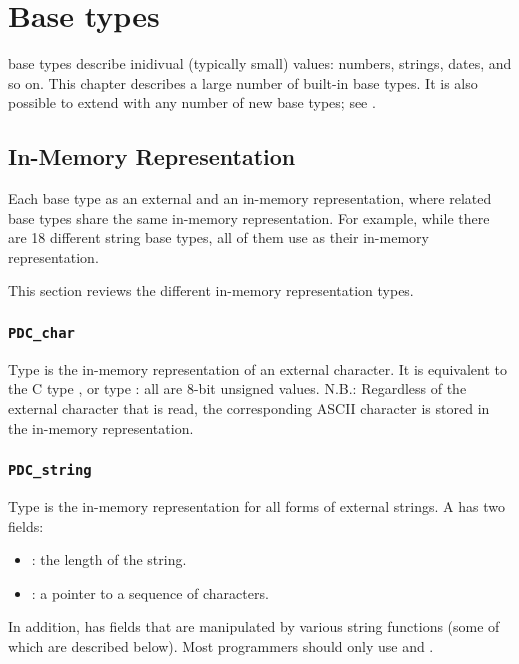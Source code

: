 \chapter{Base types}
\label{chap:base-types}

\PADSL{} base types describe inidivual (typically small) values: numbers, strings, dates, and so on.
This chapter describes a large number of built-in \PADSL{} base types.
It is also possible to extend \PADSL{} with any
number of new base types; see .

\section{In-Memory Representation}
\label{sec:base-types-rep}

Each base type as an external and an in-memory representation, where
related base types share the same in-memory representation.  For
example, while there are 18 different string base types, all of them
use  as their in-memory representation.

This section reviews the different in-memory representation types.

\subsection{{\tt PDC\_char}}

Type  is the in-memory representation of an external
character.  It is equivalent to the C type , or type
: all are 8-bit unsigned values.  N.B.: Regardless of the
external character that is read, the corresponding ASCII character is stored in 
the in-memory representation.

\subsection{{\tt PDC\_string}}

Type  is the in-memory representation for all forms of
external strings.  A   has two fields:
\begin{itemize}
\item {} : the length of the string.
\item {} : a pointer to a sequence of  characters.
\end{itemize}
In addition,  has fields that are manipulated
by various string functions (some of which are described below).
Most programmers should only use  and .

